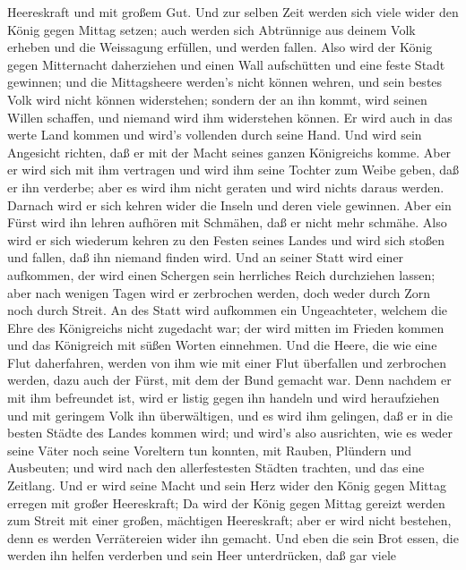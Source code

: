 Heereskraft und mit großem Gut.  Und zur selben Zeit werden
sich viele wider den König gegen Mittag setzen; auch werden sich
Abtrünnige aus deinem Volk erheben und die Weissagung erfüllen, und
werden fallen.  Also wird der König gegen Mitternacht
daherziehen und einen Wall aufschütten und eine feste Stadt gewinnen;
und die Mittagsheere werden's nicht können wehren, und sein bestes Volk
wird nicht können widerstehen;  sondern der an ihn kommt,
wird seinen Willen schaffen, und niemand wird ihm widerstehen können. Er
wird auch in das werte Land kommen und wird's vollenden durch seine
Hand.  Und wird sein Angesicht richten, daß er mit der
Macht seines ganzen Königreichs komme. Aber er wird sich mit ihm
vertragen und wird ihm seine Tochter zum Weibe geben, daß er ihn
verderbe; aber es wird ihm nicht geraten und wird nichts daraus werden.
 Darnach wird er sich kehren wider die Inseln und deren
viele gewinnen. Aber ein Fürst wird ihn lehren aufhören mit Schmähen,
daß er nicht mehr schmähe.  Also wird er sich wiederum
kehren zu den Festen seines Landes und wird sich stoßen und fallen, daß
ihn niemand finden wird.  Und an seiner Statt wird einer
aufkommen, der wird einen Schergen sein herrliches Reich durchziehen
lassen; aber nach wenigen Tagen wird er zerbrochen werden, doch weder
durch Zorn noch durch Streit.  An des Statt wird aufkommen
ein Ungeachteter, welchem die Ehre des Königreichs nicht zugedacht war;
der wird mitten im Frieden kommen und das Königreich mit süßen Worten
einnehmen.  Und die Heere, die wie eine Flut daherfahren,
werden von ihm wie mit einer Flut überfallen und zerbrochen werden, dazu
auch der Fürst, mit dem der Bund gemacht war.  Denn nachdem
er mit ihm befreundet ist, wird er listig gegen ihn handeln und wird
heraufziehen und mit geringem Volk ihn überwältigen,  und
es wird ihm gelingen, daß er in die besten Städte des Landes kommen
wird; und wird's also ausrichten, wie es weder seine Väter noch seine
Voreltern tun konnten, mit Rauben, Plündern und Ausbeuten; und wird nach
den allerfestesten Städten trachten, und das eine Zeitlang.
 Und er wird seine Macht und sein Herz wider den König
gegen Mittag erregen mit großer Heereskraft; Da wird der König gegen
Mittag gereizt werden zum Streit mit einer großen, mächtigen
Heereskraft; aber er wird nicht bestehen, denn es werden Verrätereien
wider ihn gemacht.  Und eben die sein Brot essen, die
werden ihn helfen verderben und sein Heer unterdrücken, daß gar viele
